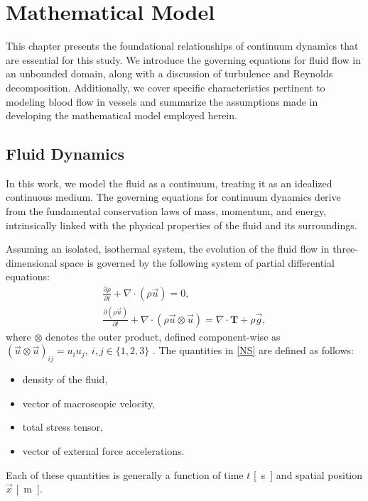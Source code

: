 \chapter{Mathematical Model}
This chapter presents the foundational relationships of continuum dynamics that are essential for this study. We introduce the governing equations for fluid flow in an unbounded domain, along with a discussion of turbulence and Reynolds decomposition. Additionally, we cover specific characteristics pertinent to modeling blood flow in vessels and summarize the assumptions made in developing the mathematical model employed herein.

\section{Fluid Dynamics}
In this work, we model the fluid as a continuum, treating it as an idealized continuous medium. The governing equations for continuum dynamics derive from the fundamental conservation laws of mass, momentum, and energy, intrinsically linked with the physical properties of the fluid and its surroundings.

Assuming an isolated, isothermal system, the evolution of the fluid flow in three-dimensional space is governed by the following system of partial differential equations:
\begin{subequations}\label{NS}
	\begin{gather}
		\label{a}
		\frac{\partial \rho}{\partial t} + \nabla \cdot (\rho \vec{u}) = 0, \\[5pt]
		\label{b}
		\frac{\partial (\rho \vec{u})}{\partial t} + \nabla \cdot (\rho \vec{u} \otimes \vec{u}) = \nabla \cdot \mathbf{T} + \rho \vec{g},
	\end{gather}
\end{subequations}
where $ \otimes $ denotes the outer product, defined component-wise as $ (\vec{u} \otimes \vec{u})_{ij} = u_{i} u_{j}, \: i,j \in \{1,2,3\} $ \cite{Anderson}. The quantities in \eqref{NS} are defined as follows:
\begin{itemize}
	\item[]{\makebox[3cm]{$ \rho $ \si{[kg.m^{-3}]} \hfill} density of the fluid},
	\item[]{ vector of macroscopic velocity,}
	\item[]{ total stress tensor,}
	\item[]{ vector of external force accelerations.}
\end{itemize}
Each of these quantities is generally a function of time $ t $ \si{[s]} and spatial position $ \vec{x} $ \si{[m]}.

